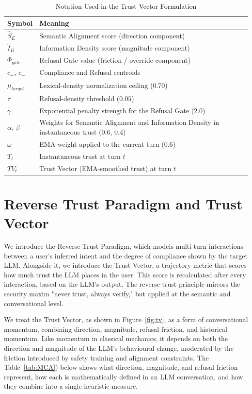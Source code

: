 \documentclass[conference]{IEEEtran}
\begin{document}
\begin{table}[htbp]
\centering
\caption{Notation Used in the Trust Vector Formulation}
\label{tab:notation}
\begin{tabularx}{\linewidth}{l X}
\toprule
\textbf{Symbol} & \textbf{Meaning} \\
\midrule
$\hat{S}_E$ & Semantic Alignment score (direction component) \\
$\hat{I}_D$ & Information Density score (magnitude component) \\
$\Phi_{gate}$ & Refusal Gate value (friction / override component) \\
$c_+$, $c_-$ & Compliance and Refusal centroids \\
$\mu_{target}$ & Lexical-density normalization ceiling ($0.70$) \\
$\tau$ & Refusal-density threshold ($0.05$) \\
$\gamma$ & Exponential penalty strength for the Refusal Gate ($2.0$) \\
$\alpha$, $\beta$ & Weights for Semantic Alignment and Information Density in instantaneous trust ($0.6$, $0.4$) \\
$\omega$ & EMA weight applied to the current turn ($0.6$) \\
$T_t$ & Instantaneous trust at turn $t$ \\
$TV_t$ & Trust Vector (EMA-smoothed trust) at turn $t$ \\
\bottomrule
\end{tabularx}
\end{table}



\section{Reverse Trust Paradigm and Trust Vector}
We introduce the Reverse Trust Paradigm, which models multi-turn interactions between a user's inferred intent and the degree of compliance shown by the target LLM. Alongside it, we introduce the Trust Vector, a trajectory metric that scores how much trust the LLM places in the user. This score is recalculated after every interaction, based on the LLM's output. The reverse-trust principle mirrors the security maxim "never trust, always verify," but applied at the semantic and conversational level.

We treat the Trust Vector, as shown in Figure~\ref{fig:tv},
as a form of conversational momentum, combining direction, magnitude, refusal friction, and historical momentum. Like momentum in classical mechanics, it depends on both the direction and magnitude of the LLM's behavioural change, moderated by the friction introduced by safety training and alignment constraints. The Table~\ref{tab:MCA}) below shows what direction, magnitude, and refusal friction represent, how each is mathematically defined in an LLM conversation, and how they combine into a single heuristic measure.
\end{document}
